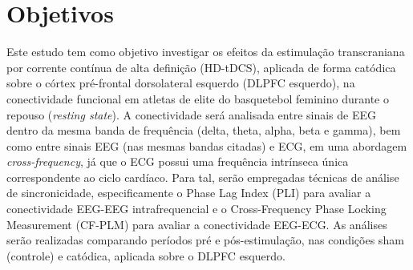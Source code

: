 \chapter{Objetivos}
\label{chap:objetivos}

Este estudo tem como objetivo investigar os efeitos da estimulação transcraniana por corrente contínua de alta definição (HD-tDCS), aplicada de forma catódica sobre o córtex pré-frontal dorsolateral esquerdo (DLPFC esquerdo), na conectividade funcional em atletas de elite do basquetebol feminino durante o repouso (\textit{resting state}). A conectividade será analisada entre sinais de EEG dentro da mesma banda de frequência (delta, theta, alpha, beta e gamma), bem como entre sinais EEG (nas mesmas bandas citadas) e ECG, em uma abordagem \textit{cross-frequency}, já que o ECG possui uma frequência intrínseca única correspondente ao ciclo cardíaco. Para tal, serão empregadas técnicas de análise de sincronicidade, especificamente o Phase Lag Index (PLI) para avaliar a conectividade EEG-EEG intrafrequencial e o Cross-Frequency Phase Locking Measurement (CF-PLM) para avaliar a conectividade EEG-ECG. As análises serão realizadas comparando períodos pré e pós-estimulação, nas condições sham (controle) e catódica, aplicada sobre o DLPFC esquerdo.